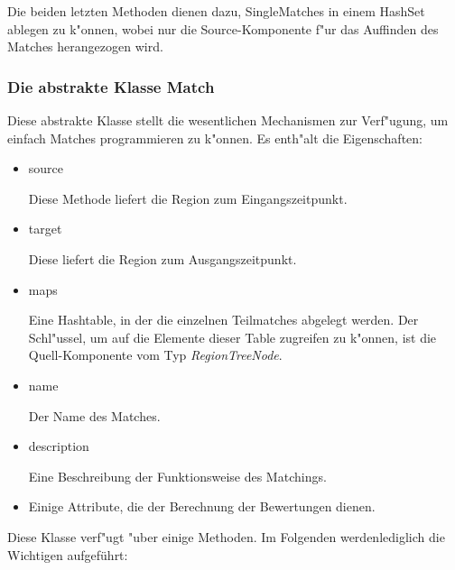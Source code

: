 Die beiden letzten Methoden dienen dazu, SingleMatches in einem HashSet ablegen zu k"onnen, wobei nur die Source-Komponente f"ur das Auffinden des Matches herangezogen wird.

\subsubsection{Die abstrakte Klasse Match}\label{MatchKlasse}
Diese abstrakte Klasse stellt die wesentlichen Mechanismen zur Verf"ugung, um einfach Matches programmieren zu k"onnen. Es enth"alt die Eigenschaften:
\begin{itemize}
\item source

Diese Methode liefert die Region zum Eingangszeitpunkt.

\item target

Diese liefert die Region zum Ausgangszeitpunkt.

\item maps

Eine Hashtable, in der die einzelnen Teilmatches abgelegt werden. Der Schl"ussel, um auf die Elemente dieser Table zugreifen zu k"onnen, ist die Quell-Komponente vom Typ \textit{RegionTreeNode}.

\item name

Der Name des Matches.

\item description

Eine Beschreibung der Funktionsweise des Matchings.

\item Einige Attribute, die der Berechnung der Bewertungen dienen.
\end{itemize} 

Diese Klasse verf"ugt "uber einige Methoden. Im Folgenden werdenlediglich die Wichtigen aufgeführt:

